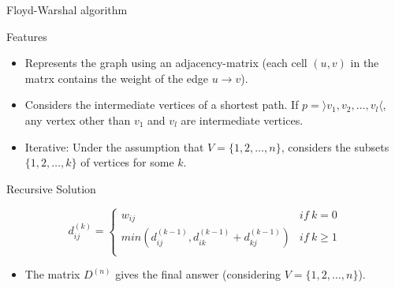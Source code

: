 \begin{frame}{Floyd-Warshal algorithm}

  \begin{block}{Features}
    \begin{itemize}
     \item Represents the graph using an adjacency-matrix \pause (each cell $(u, v)$ in
       the matrx contains the weight of the edge $u \rightarrow v$). \pause

     \item Considers the intermediate vertices of a shortest path. If $p = \rangle v_1, v_2, \ldots, v_l \langle$,
       any vertex other than $v_1$ and $v_l$ are intermediate vertices. \pause

     \item Iterative: Under the assumption that $V = \{1, 2, \ldots, n\}$, considers the subsets $\{1, 2, \ldots, k\}$
       of vertices for some $k$. 
    \end{itemize}
  \end{block}
\end{frame}

\begin{frame}
\end{frame}

\begin{frame}{Recursive Solution}

\[
d^{(k)}_{ij}= \left\{
\begin{array}{ll}
      w_{ij}                    & if\ k = 0\\ 
      min(d^{(k-1)}_{ij}, d^{(k-1)}_{ik}+d^{(k-1)}_{kj})  & if\ k \geq 1 \\   
\end{array} 
\right. 
\]

\pause

\begin{itemize}
  \item The matrix $D^{(n)}$ gives the final answer (considering $V = \{1, 2, \ldots, n\}$).
\end{itemize}
\end{frame}

